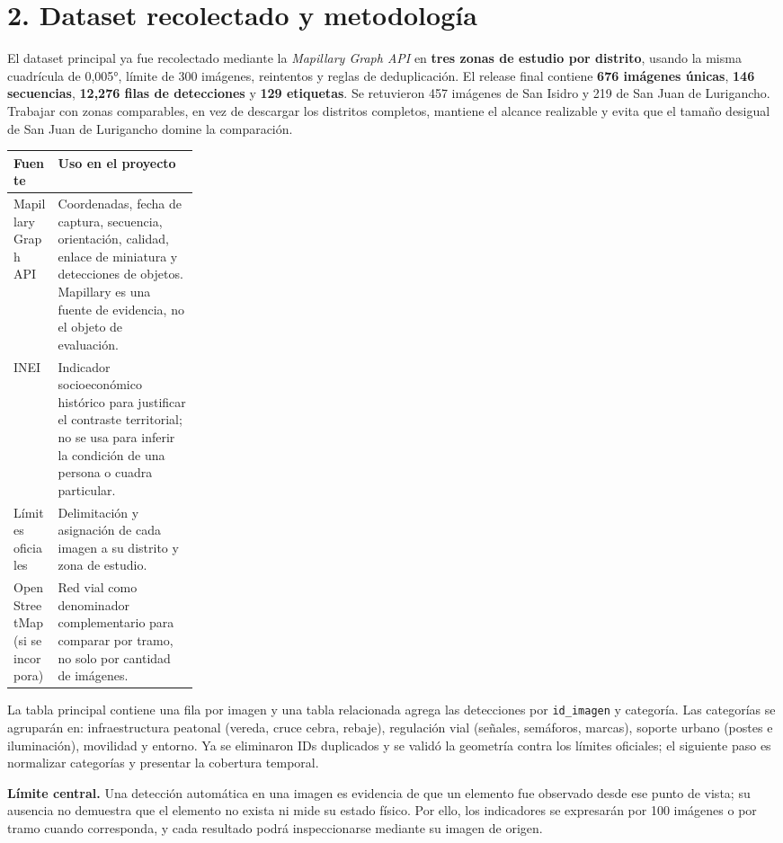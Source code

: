 \documentclass[10pt]{article}
\begin{document}
\section*{2. Dataset recolectado y metodología}

El dataset principal ya fue recolectado mediante la \textit{Mapillary Graph API} en \textbf{tres zonas de estudio por distrito}, usando la misma cuadrícula de 0,005°, límite de 300 imágenes, reintentos y reglas de deduplicación. El release final contiene \textbf{676 imágenes únicas}, \textbf{146 secuencias}, \textbf{12,276 filas de detecciones} y \textbf{129 etiquetas}. Se retuvieron 457 imágenes de San Isidro y 219 de San Juan de Lurigancho. Trabajar con zonas comparables, en vez de descargar los distritos completos, mantiene el alcance realizable y evita que el tamaño desigual de San Juan de Lurigancho domine la comparación.

\begin{tabularx}{\linewidth}{@{}p{0.24\linewidth}X@{}}
\toprule
\textbf{Fuente} & \textbf{Uso en el proyecto} \\
\midrule
Mapillary Graph API & Coordenadas, fecha de captura, secuencia, orientación, calidad, enlace de miniatura y detecciones de objetos. Mapillary es una fuente de evidencia, no el objeto de evaluación. \\
INEI & Indicador socioeconómico histórico para justificar el contraste territorial; no se usa para inferir la condición de una persona o cuadra particular. \\
Límites oficiales & Delimitación y asignación de cada imagen a su distrito y zona de estudio. \\
OpenStreetMap (si se incorpora) & Red vial como denominador complementario para comparar por tramo, no solo por cantidad de imágenes. \\
\bottomrule
\end{tabularx}

La tabla principal contiene una fila por imagen y una tabla relacionada agrega las detecciones por \texttt{id\_imagen} y categoría. Las categorías se agruparán en: infraestructura peatonal (vereda, cruce cebra, rebaje), regulación vial (señales, semáforos, marcas), soporte urbano (postes e iluminación), movilidad y entorno. Ya se eliminaron IDs duplicados y se validó la geometría contra los límites oficiales; el siguiente paso es normalizar categorías y presentar la cobertura temporal.

\textbf{Límite central.} Una detección automática en una imagen es evidencia de que un elemento fue observado desde ese punto de vista; su ausencia no demuestra que el elemento no exista ni mide su estado físico. Por ello, los indicadores se expresarán por 100 imágenes o por tramo cuando corresponda, y cada resultado podrá inspeccionarse mediante su imagen de origen.
\end{document}
